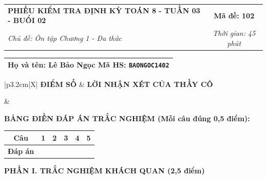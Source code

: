 \documentclass[12pt,a4paper]{article}
\begin{document}
\newpage


\noindent
\begin{tabularx}{\linewidth}{|X|c|}
\hline
\textbf{PHIẾU KIỂM TRA ĐỊNH KỲ TOÁN 8 - TUẦN 03 - BUỔI 02} & \textbf{Mã đề: 102} \\
\textit{Chủ đề: Ôn tập Chương 1 - Đa thức} & \textit{Thời gian: 45 phút} \\
\hline
\end{tabularx}

\vspace{1mm}

\noindent
\begin{tabularx}{\linewidth}{|X|}
\hline
\rule[-2mm]{0pt}{7.5mm}\textbf{Họ và tên:} \textbf{\large Lê Bảo Ngọc} \hfill \textbf{Mã HS:} \texttt{BAONGOC1402} \quad \\
\hline
\end{tabularx}

\vspace{1mm}

\noindent
\begin{tabularx}{\linewidth}{|p{3.2cm}|X|}
\hline
\centering\textbf{ĐIỂM SỐ} & \centering\textbf{LỜI NHẬN XÉT CỦA THẦY CÔ} \tabularnewline
\hline
\rule{0pt}{1.3cm} & \tabularnewline
\hline
\end{tabularx}

\vspace{1.2mm}

\noindent\textbf{BẢNG ĐIỀN ĐÁP ÁN TRẮC NGHIỆM (Mỗi câu đúng 0,5 điểm):}
\vspace{0.8mm}

\noindent
\renewcommand{\arraystretch}{1.35}
\begin{tabularx}{\linewidth}{|c|*{5}{>{\centering\arraybackslash}X|}}
\hline
\textbf{Câu} & \textbf{1} & \textbf{2} & \textbf{3} & \textbf{4} & \textbf{5} \\
\hline
\textbf{Đáp án} & & & & & \\
\hline
\end{tabularx}
\renewcommand{\arraystretch}{1.0}

\vspace{1.5mm}

\noindent\textbf{\large PHẦN I. TRẮC NGHIỆM KHÁCH QUAN (2,5 điểm)}
\vspace{1mm}
\end{document}
